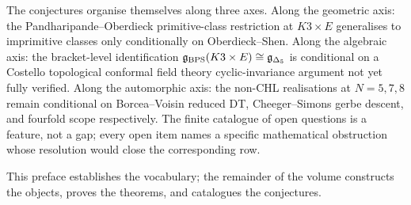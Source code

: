 The conjectures organise themselves along three axes. Along the
geometric axis: the Pandharipande--Oberdieck primitive-class
restriction at $K3 \times E$ generalises to imprimitive classes only
conditionally on Oberdieck--Shen. Along the algebraic axis: the
bracket-level identification $\mathfrak{g}_{\mathrm{BPS}}(K3 \times E)
\cong \mathfrak{g}_{\Delta_5}$ is conditional on a Costello topological
conformal field theory cyclic-invariance argument not yet fully
verified. Along the automorphic axis: the non-CHL realisations at
$N = 5, 7, 8$ remain conditional on Borcea--Voisin reduced DT,
Cheeger--Simons gerbe descent, and fourfold scope respectively.
The finite catalogue of open questions is a feature, not a gap;
every open item names a specific mathematical obstruction whose
resolution would close the corresponding row.

This preface establishes the vocabulary; the remainder of the
volume constructs the objects, proves the theorems, and catalogues
the conjectures.
